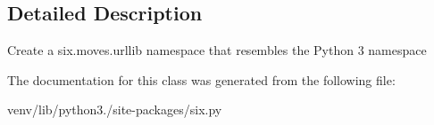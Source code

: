 \subsection{Detailed Description}
\begin{DoxyVerb}Create a six.moves.urllib namespace that resembles the Python 3 namespace\end{DoxyVerb}
 

The documentation for this class was generated from the following file\+:\begin{DoxyCompactItemize}
\item 
venv/lib/python3./site-\/packages/six.\+py\end{DoxyCompactItemize}
